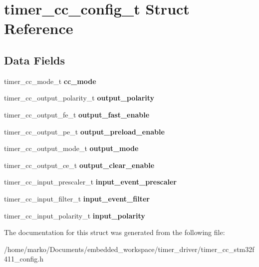\hypertarget{structtimer__cc__config__t}{}\section{timer\+\_\+cc\+\_\+config\+\_\+t Struct Reference}
\label{structtimer__cc__config__t}
\subsection*{Data Fields}
\begin{DoxyCompactItemize}
\item 
\mbox{\label{structtimer__cc__config__t_aa1903ec0ba4500a4e29acd8791a6d4cc}} 
timer\+\_\+cc\+\_\+mode\+\_\+t {\bfseries cc\+\_\+mode}
\item 
\mbox{\label{structtimer__cc__config__t_a0a5da7bca402a4196c5edd12329cb965}} 
timer\+\_\+cc\+\_\+output\+\_\+polarity\+\_\+t {\bfseries output\+\_\+polarity}
\item 
\mbox{\label{structtimer__cc__config__t_a7b3472060b75968f2686db112b700530}} 
timer\+\_\+cc\+\_\+output\+\_\+fe\+\_\+t {\bfseries output\+\_\+fast\+\_\+enable}
\item 
\mbox{\label{structtimer__cc__config__t_ad392f1537a58c13a98a5c76f6019cfa2}} 
timer\+\_\+cc\+\_\+output\+\_\+pe\+\_\+t {\bfseries output\+\_\+preload\+\_\+enable}
\item 
\mbox{\label{structtimer__cc__config__t_a5f9f6841dbd86558517bb472b4daad88}} 
timer\+\_\+cc\+\_\+output\+\_\+mode\+\_\+t {\bfseries output\+\_\+mode}
\item 
\mbox{\label{structtimer__cc__config__t_a87dbba1714ff844cdf36ae87a3a86e19}} 
timer\+\_\+cc\+\_\+output\+\_\+ce\+\_\+t {\bfseries output\+\_\+clear\+\_\+enable}
\item 
\mbox{\label{structtimer__cc__config__t_ab7cf4de41a7ee3ee78bb9999f2092565}} 
timer\+\_\+cc\+\_\+input\+\_\+prescaler\+\_\+t {\bfseries input\+\_\+event\+\_\+prescaler}
\item 
\mbox{\label{structtimer__cc__config__t_ac2cab03b6d1e6c64bb83eb0a78f08391}} 
timer\+\_\+cc\+\_\+input\+\_\+filter\+\_\+t {\bfseries input\+\_\+event\+\_\+filter}
\item 
\mbox{\label{structtimer__cc__config__t_ace0c49b91c2083d06b4bbd59c5eab9fb}} 
timer\+\_\+cc\+\_\+input\+\_\+polarity\+\_\+t {\bfseries input\+\_\+polarity}
\end{DoxyCompactItemize}


The documentation for this struct was generated from the following file\+:\begin{DoxyCompactItemize}
\item 
/home/marko/\+Documents/embedded\+\_\+workspace/timer\+\_\+driver/timer\+\_\+cc\+\_\+stm32f411\+\_\+config.\+h\end{DoxyCompactItemize}
